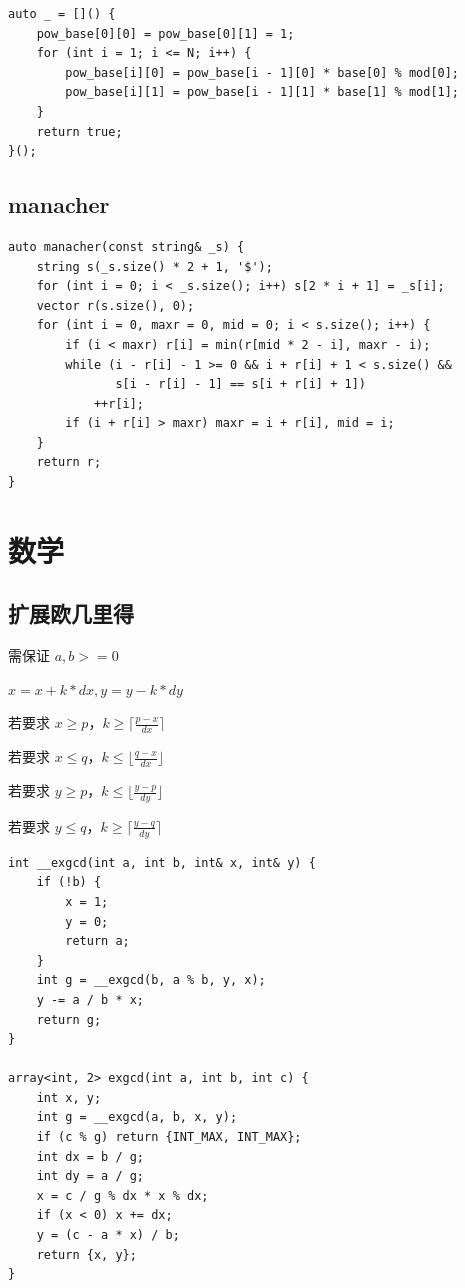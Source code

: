\documentclass[UTF8]{ctexart}
\begin{document}
\begin{sloppypar}
\begin{lstlisting}[style=cpp]
auto _ = []() {
    pow_base[0][0] = pow_base[0][1] = 1;
    for (int i = 1; i <= N; i++) {
        pow_base[i][0] = pow_base[i - 1][0] * base[0] % mod[0];
        pow_base[i][1] = pow_base[i - 1][1] * base[1] % mod[1];
    }
    return true;
}();
\end{lstlisting}

\subsection{manacher}

\begin{lstlisting}[style=cpp]
auto manacher(const string& _s) {
    string s(_s.size() * 2 + 1, '$');
    for (int i = 0; i < _s.size(); i++) s[2 * i + 1] = _s[i];
    vector r(s.size(), 0);
    for (int i = 0, maxr = 0, mid = 0; i < s.size(); i++) {
        if (i < maxr) r[i] = min(r[mid * 2 - i], maxr - i);
        while (i - r[i] - 1 >= 0 && i + r[i] + 1 < s.size() &&
               s[i - r[i] - 1] == s[i + r[i] + 1])
            ++r[i];
        if (i + r[i] > maxr) maxr = i + r[i], mid = i;
    }
    return r;
}
\end{lstlisting}

\clearpage

\section{数学}

\subsection{扩展欧几里得}

需保证 $a,b>=0$

$x=x+k*dx,y=y-k*dy$

若要求 $x\ge p$，$k\ge\lceil \frac{p-x}{dx}\rceil$

若要求 $x\le q$，$k\le\lfloor \frac{q-x}{dx}\rfloor$

若要求 $y\ge p$，$k\le\lfloor \frac{y-p}{dy}\rfloor$

若要求 $y\le q$，$k\ge\lceil \frac{y-q}{dy}\rceil$

\begin{lstlisting}[style=cpp]
int __exgcd(int a, int b, int& x, int& y) {
    if (!b) {
        x = 1;
        y = 0;
        return a;
    }
    int g = __exgcd(b, a % b, y, x);
    y -= a / b * x;
    return g;
}

array<int, 2> exgcd(int a, int b, int c) {
    int x, y;
    int g = __exgcd(a, b, x, y);
    if (c % g) return {INT_MAX, INT_MAX};
    int dx = b / g;
    int dy = a / g;
    x = c / g % dx * x % dx;
    if (x < 0) x += dx;
    y = (c - a * x) / b;
    return {x, y};
}
\end{lstlisting}


\end{sloppypar}
\end{document}
